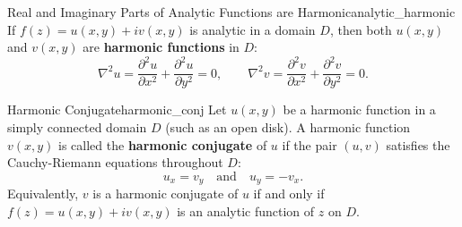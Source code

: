 \begin{theorem}{Real and Imaginary Parts of Analytic Functions are Harmonic}{analytic_harmonic}
If $f(z) = u(x, y) + i v(x, y)$ is analytic in a domain $D$, then both $u(x, y)$ and $v(x, y)$ are \textbf{harmonic functions} in $D$:
\begin{equation}
\nabla^2 u = \frac{\partial^2 u}{\partial x^2} + \frac{\partial^2 u}{\partial y^2} = 0, \qquad \nabla^2 v = \frac{\partial^2 v}{\partial x^2} + \frac{\partial^2 v}{\partial y^2} = 0.
\end{equation}
\end{theorem}

\begin{definition}{Harmonic Conjugate}{harmonic_conj}
Let $u(x, y)$ be a harmonic function in a simply connected domain $D$ (such as an open disk). A harmonic function $v(x, y)$ is called the \textbf{harmonic conjugate} of $u$ if the pair $(u, v)$ satisfies the Cauchy-Riemann equations throughout $D$:
\begin{equation}
u_x = v_y \quad \text{and} \quad u_y = -v_x.
\end{equation}
Equivalently, $v$ is a harmonic conjugate of $u$ if and only if $f(z) = u(x, y) + i v(x, y)$ is an analytic function of $z$ on $D$.
\end{definition}

